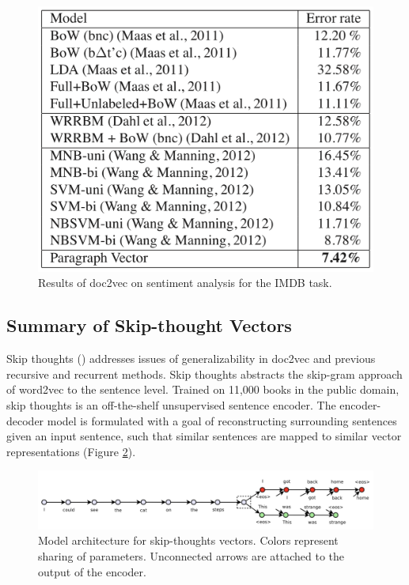 \begin{figure}
\centering
  \includegraphics[width=.7\linewidth]{files/doc2vec-5.png}
  \caption{Results of doc2vec on sentiment analysis for the IMDB task.}
  \label{fig:doc2vec-res2}
\end{figure}



\subsection{Summary of Skip-thought Vectors}

Skip thoughts (\cite{DBLP:journals/corr/KirosZSZTUF15}) addresses issues of generalizability in doc2vec and previous recursive and recurrent methods. Skip thoughts abstracts the skip-gram approach of word2vec to the sentence level. Trained on 11,000 books in the public domain, skip thoughts is an off-the-shelf unsupervised sentence encoder. The encoder-decoder model is formulated with a goal of reconstructing surrounding sentences given an input sentence, such that similar sentences are mapped to similar vector representations (Figure \ref{fig:skipthoughts-1}). 

\begin{figure}[h!]
\centering
  \includegraphics[width=.8\linewidth]{files/skipthoughts-1.png}
  \caption{Model architecture for skip-thoughts vectors. Colors represent sharing of parameters. Unconnected arrows are attached to the output of the encoder.}
  \label{fig:skipthoughts-1}
\end{figure}

